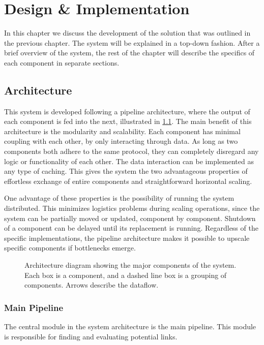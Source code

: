 \chapter{Design \& Implementation}\label{chap:design}
In this chapter we discuss the development of the solution that was outlined in the previous chapter. The system will be explained in a top-down fashion. After a brief overview of the system, the rest of the chapter will describe the specifics of each component in separate sections.

\section{Architecture}\label{sec:design_overview}
This system is developed following a pipeline architecture, where the output of each component is fed into the next, illustrated in \cref{fig:system-overview}. The main benefit of this architecture is the modularity and scalability. Each component has minimal coupling with each other, by only interacting through data. As long as two components both adhere to the same protocol, they can completely disregard any logic or functionality of each other. The data interaction can be implemented as any type of caching. This gives the system the two advantageous properties of effortless exchange of entire components and straightforward horizontal scaling.

One advantage of these properties is the possibility of running the system distributed. This minimizes logistics problems during scaling operations, since the system can be partially moved or updated, component by component. Shutdown of a component can be delayed until its replacement is running. Regardless of the specific implementations, the pipeline architecture makes it possible to upscale specific components if bottlenecks emerge.

\begin{figure}[tb]%
  \centering
  
\caption[Architecture diagram showing the major components of the system]{Architecture diagram showing the major components of the system. Each box is a component, and a dashed line box is a grouping of components. Arrows describe the dataflow.}%
\label{fig:system-overview}%
\end{figure}

\subsection{Main Pipeline}
The central module in the system architecture is the main pipeline. This module is responsible for finding and evaluating potential links.

